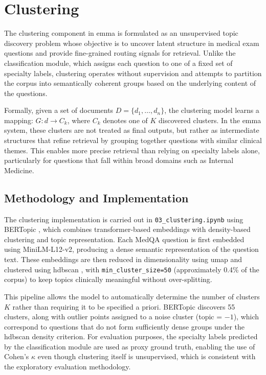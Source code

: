 \chapter{Clustering}

The clustering component in \gls{emma} is formulated as an unsupervised topic discovery problem whose objective is to uncover latent structure in medical exam questions and provide fine-grained routing signals for retrieval. Unlike the classification module, which assigns each question to one of a fixed set of specialty labels, clustering operates without supervision and attempts to partition the corpus into semantically coherent groups based on the underlying content of the questions. 

Formally, given a set of documents $D = \{d_1,\ldots,d_n\}$, the clustering model learns a mapping: $G:d \rightarrow C_k$, where $C_k$ denotes one of $K$ discovered clusters. In the \gls{emma} system, these clusters are not treated as final outputs, but rather as intermediate structures that refine retrieval by grouping together questions with similar clinical themes. This enables more precise retrieval than relying on specialty labels alone, particularly for questions that fall within broad domains such as Internal Medicine. 

\section{Methodology and Implementation}
The clustering implementation is carried out in \texttt{03\_clustering.ipynb} using BERTopic \cite{grootendorst_bertopic_2022}, which combines transformer-based embeddings with density-based clustering and topic representation. Each MedQA question is first embedded using MiniLM-L12-v2, producing a dense semantic representation of the question text. These embeddings are then reduced in dimensionality using \gls{umap} \cite{mcinnes_umap_2018} and clustered using \gls{hdbscan} \cite{campello_densitybased_2013}, with \texttt{min\_cluster\_size=50} (approximately 0.4\% of the corpus) to keep topics clinically meaningful without over-splitting. 

This pipeline allows the model to automatically determine the number of clusters $K$ rather than requiring it to be specified a priori. BERTopic discovers 55 clusters, along with outlier points assigned to a noise cluster (topic = $-1$), which correspond to questions that do not form sufficiently dense groups under the \gls{hdbscan} density criterion. For evaluation purposes, the specialty labels predicted by the classification module are used as proxy ground truth, enabling the use of Cohen's $\kappa$ even though clustering itself is unsupervised, which is consistent with the exploratory evaluation methodology. 

